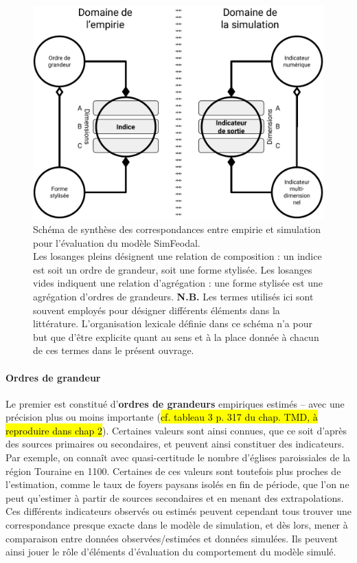 \begin{figure}[H]
	\captionsetup{width=\linewidth}
	\includegraphics[width=\linewidth]{img/schema_indice_indicateur.pdf}
	\caption{Schéma de synthèse des correspondances entre empirie et simulation pour l'évaluation du modèle SimFeodal.\\ Les losanges pleins désignent une relation de composition : un indice est soit un ordre de grandeur, soit une forme stylisée. Les losanges vides indiquent une relation d'agrégation : une forme stylisée est une agrégation d'ordres de grandeurs.
		\textbf{N.B.} Les termes utilisés ici sont souvent employés pour désigner différents éléments dans la littérature. L'organisation lexicale définie dans ce schéma n'a pour but que d'être explicite quant au sens et à la place donnée à chacun de ces termes dans le présent ouvrage. } 
	\label{fig:schema_indices} 
\end{figure}


\paragraph{Ordres de grandeur}
Le premier est constitué d'\textbf{ordres de grandeurs} empiriques estimés -- avec une précision plus ou moins importante (\hl{cf. tableau 3 p. 317 du chap. TMD, à reproduire dans chap 2}). Certaines valeurs sont ainsi connues, que ce soit d'après des sources primaires ou secondaires, et peuvent ainsi constituer des \og indicateurs\fg{}. Par exemple, on connaît avec quasi-certitude le nombre d'églises paroissiales de la région Touraine en 1100. Certaines de ces valeurs sont toutefois plus proches de l'estimation, comme le taux de foyers paysans isolés en fin de période, que l'on ne peut qu'estimer à partir de sources secondaires et en menant des extrapolations. Ces différents indicateurs observés ou estimés peuvent cependant tous trouver une correspondance presque exacte dans le modèle de simulation, et dès lors, mener à comparaison entre données observées/estimées et données simulées. Ils peuvent ainsi jouer le rôle d'éléments d'évaluation du comportement du modèle simulé.

